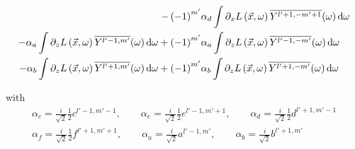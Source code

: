 \documentclass[10pt]{scrartcl}
\begin{document}
\begin{align*}
-\left({-1}\right)^{m'}&\alpha_d\int{\partial_xL\left (\vec{x} ,\omega \right )\overline{Y^{l'+1, -m'+1}}(\omega )\,\mathrm{d}\omega}
\\
-\alpha_a\int{\partial_zL\left (\vec{x} ,\omega \right )\overline{Y^{l'-1, m'}}(\omega )\,\mathrm{d}\omega}
+\left({-1}\right)^{m'}&\alpha_a\int{\partial_zL\left (\vec{x} ,\omega \right )\overline{Y^{l'-1, -m'}}(\omega )\,\mathrm{d}\omega}
\\
-\alpha_b\int{\partial_zL\left (\vec{x} ,\omega \right )\overline{Y^{l'+1, m'}}(\omega )\,\mathrm{d}\omega}
+\left({-1}\right)^{m'}&\alpha_b\int{\partial_zL\left (\vec{x} ,\omega \right )\overline{Y^{l'+1, -m'}}(\omega )\,\mathrm{d}\omega}
\end{align*}

with 
\begin{align*}
\alpha_c = \frac{i}{\sqrt{2}}\frac{1}{2}c^{{l'-1,m'-1}}
,\qquad
\alpha_e = \frac{i}{\sqrt{2}}\frac{1}{2}e^{{l'-1,m'+1}}
,\qquad
\alpha_d = \frac{i}{\sqrt{2}}\frac{1}{2}d^{{l'+1,m'-1}}
\\
\alpha_f = \frac{i}{\sqrt{2}}\frac{1}{2}f^{{l'+1,m'+1}}
,\qquad
\alpha_a = \frac{i}{\sqrt{2}}a^{{l'-1,m'}}
,\qquad
\alpha_b = \frac{i}{\sqrt{2}}b^{{l'+1,m'}}
\end{align*}
\end{document}
